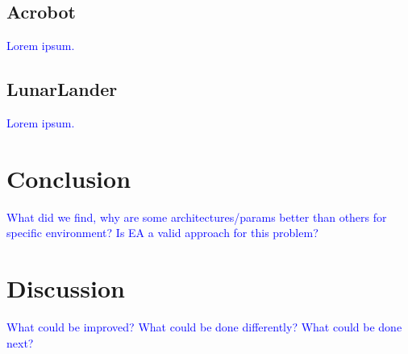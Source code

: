 \documentclass{article}
\newcommand{\TODO}[1]{\textcolor{blue}{#1}}
\begin{document}
\subsection{Acrobot}
\label{ssec:ab}

\TODO{Lorem ipsum.}

\subsection{LunarLander}
\label{ssec:ll}

\TODO{Lorem ipsum.}

\section{Conclusion}
\label{sec:conc}

\TODO{
    What did we find, why are some architectures/params better than others for specific environment?
    Is EA a valid approach for this problem?
}

\section{Discussion}
\label{sec:disc}

\TODO{
    What could be improved?
    What could be done differently?
    What could be done next?
}


\end{document}

